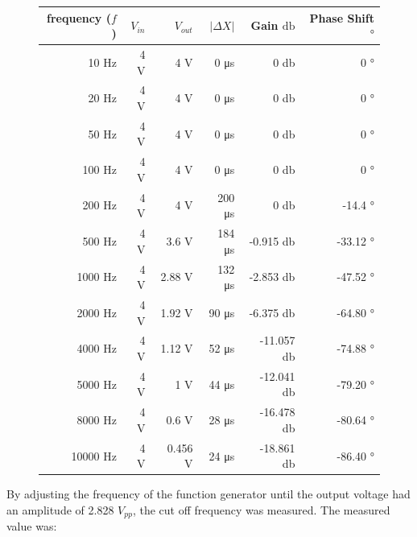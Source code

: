 \documentclass{article}
\begin{document}
\begin{figure}[H]
\centering
\begin{tabular}{ | r | r | r | r | r | r | }
	\hline
	frequency ($f$) & $V_{in}$ & $V_{out}$ & $|\Delta X|$ & Gain $\si{\decibel}$ & Phase Shift $\si{\degree}$ \\ \hline
	10 \si{\hertz} & 4 \si{\volt} & 4 \si{\volt} & 0 \si{\micro\second} & 0 \si{\decibel} & 0 \si{\degree}\\ \hline
	20 \si{\hertz} & 4 \si{\volt} & 4 \si{\volt} & 0 \si{\micro\second} & 0 \si{\decibel} & 0 \si{\degree}\\ \hline
	50 \si{\hertz} & 4 \si{\volt} & 4 \si{\volt} & 0 \si{\micro\second} & 0 \si{\decibel} & 0 \si{\degree}\\ \hline
	100 \si{\hertz} & 4 \si{\volt} & 4 \si{\volt} & 0 \si{\micro\second} & 0 \si{\decibel} & 0 \si{\degree}\\ \hline
	200 \si{\hertz} & 4 \si{\volt} & 4 \si{\volt} & 200 \si{\micro\second} & 0 \si{\decibel} & -14.4 \si{\degree}\\ \hline
	500 \si{\hertz} & 4 \si{\volt} & 3.6 \si{\volt} & 184 \si{\micro\second} & -0.915 \si{\decibel} & -33.12 \si{\degree}\\ \hline
	1000 \si{\hertz} & 4 \si{\volt} & 2.88 \si{\volt} & 132 \si{\micro\second} & -2.853 \si{\decibel} & -47.52 \si{\degree}\\ \hline
	2000 \si{\hertz} & 4 \si{\volt} & 1.92 \si{\volt} & 90 \si{\micro\second} & -6.375 \si{\decibel} & -64.80 \si{\degree}\\ \hline
	4000 \si{\hertz} & 4 \si{\volt} & 1.12 \si{\volt} & 52 \si{\micro\second} & -11.057 \si{\decibel} & -74.88 \si{\degree}\\ \hline
	5000 \si{\hertz} & 4 \si{\volt} & 1 \si{\volt} & 44 \si{\micro\second} & -12.041 \si{\decibel} & -79.20 \si{\degree}\\ \hline
	8000 \si{\hertz} & 4 \si{\volt} & 0.6 \si{\volt} & 28 \si{\micro\second} & -16.478 \si{\decibel} & -80.64 \si{\degree}\\ \hline
	10000 \si{\hertz} & 4 \si{\volt} & 0.456 \si{\volt} & 24 \si{\micro\second} & -18.861 \si{\decibel} & -86.40 \si{\degree}\\ \hline
\end{tabular}
\end{figure}

By adjusting the frequency of the function generator until the output voltage had an amplitude of 2.828 $\si{V_{pp}}$, the cut off frequency was measured. The measured value was:
\end{document}
